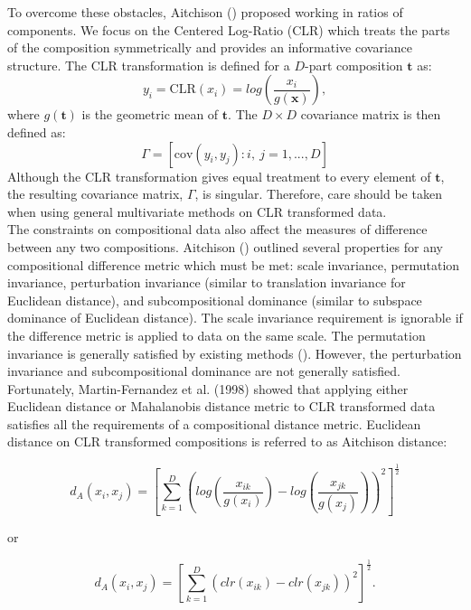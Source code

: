 \documentclass{article}\usepackage[]{graphicx}\usepackage[]{color}
\begin{document}
To overcome these obstacles, Aitchison (\cite{Aitchison1980}) proposed working in ratios of components. We focus on the Centered Log-Ratio (CLR) which treats the parts of the composition symmetrically and provides an informative covariance structure.  The CLR transformation is defined for a $D$-part composition $\mathbf{t}$ as:
\begin{equation}
y_i  = \text{CLR}(x_i) = log \left(\frac{x_i}{g(\mathbf{x})} \right),
\label{clr}
\end{equation}
where $g(\mathbf{t})$ is the geometric mean of $\mathbf{t}$.  The $D \times D$ covariance matrix is then defined as:
\begin{equation}
\Gamma = \left[\text{cov}\left(y_i, y_j \right): i,\ j = 1, ..., D \right]
\label{gamma}
\end{equation}
Although the CLR transformation gives equal treatment to every element of $\mathbf{t}$, the resulting covariance matrix, $\Gamma$, is singular.  Therefore, care should be taken when using general multivariate methods on CLR transformed data.\\

The constraints on compositional data also affect the measures of difference between any two compositions.  Aitchison (\cite{Aitchison1992}) outlined several properties for any compositional difference metric which must be met: scale invariance, permutation invariance, perturbation invariance (similar to translation invariance for Euclidean distance), and subcompositional dominance (similar to subspace dominance of Euclidean distance).  The scale invariance requirement is ignorable if the difference metric is applied to data on the same scale. The permutation invariance is generally satisfied by existing methods (\cite{Martin-Fernandez1998}).  However, the perturbation invariance and subcompositional dominance are not generally satisfied. Fortunately, Martin-Fernandez et al. (1998) showed that applying either Euclidean distance or Mahalanobis distance metric to CLR transformed data satisfies all the requirements of a compositional distance metric. Euclidean distance on CLR transformed compositions is referred to as Aitchison distance:

$$d_A(x_i, x_j) = \left[\sum_{k=1}^D \left( log \left(\frac{x_{ik}}{g(x_i)} \right) - log \left(\frac{x_{jk}}{g(x_j)} \right) \right)^2  \right]^\frac{1}{2}$$

or 

$$d_A(x_i, x_j) = \left[\sum_{k=1}^D \left( clr(x_{ik}) - clr(x_{jk}) \right)^2  \right]^\frac{1}{2}.$$
\end{document}
